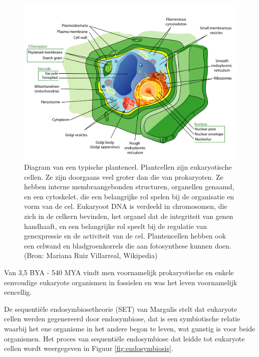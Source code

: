 \documentclass[
  11pt,
]{book}
\begin{document}
\begin{figure}

{\centering \includegraphics[width=0.5\linewidth]{./figs/plantCell} 

}

\caption{Diagram van een typische plantencel. Plantcellen zijn eukaryotische cellen. Ze zijn doorgaans veel groter dan die van prokaryoten. Ze hebben interne membraangebonden structuren, organellen genaamd, en een cytoskelet, die een belangrijke rol spelen bij de organisatie en vorm van de cel. Eukaryoot DNA is verdeeld in chromosomen, die zich in de celkern bevinden, het organel dat de integriteit van genen handhaaft, en een belangrijke rol speelt bij de regulatie van genexpressie en de activiteit van de cel. Plantencellen hebben ook een celwand en bladgroenkorrels die aan fotosynthese kunnen doen. (Bron:  Mariana Ruiz Villarreal, Wikipedia)}\label{fig:plantCell}
\end{figure}

Van 3,5 BYA - 540 MYA vindt men voornamelijk prokaryotische en enkele eenvoudige eukaryote organismen in fossielen en was het leven voornamelijk eencellig.

De sequentiële endosymbiosetheorie (SET) van Margulis stelt dat eukaryote cellen werden gegenereerd door endosymbiose, dat is een symbiotische relatie waarbij het ene organisme in het andere begon te leven, wat gunstig is voor beide organismen. Het proces van sequentiële endosymbiose dat leidde tot eukaryote cellen wordt weergegeven in Figuur \ref{fig:endosymbiosis}.
\end{document}
